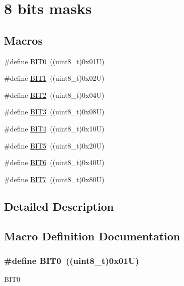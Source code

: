 \hypertarget{group_____bits___masks}{}\section{8 bits masks}
\label{group_____bits___masks}
\subsection*{Macros}
\begin{DoxyCompactItemize}
\item 
\#define \hyperlink{group_____bits___masks_gad4d43f8748b542bce39e18790f845ecc}{B\+I\+T0}~((uint8\+\_\+t)0x01\+U)
\item 
\#define \hyperlink{group_____bits___masks_ga601923eba46784638244c1ebf2622a2a}{B\+I\+T1}~((uint8\+\_\+t)0x02\+U)
\item 
\#define \hyperlink{group_____bits___masks_ga9c9560bccccb00174801c728f1ed1399}{B\+I\+T2}~((uint8\+\_\+t)0x04\+U)
\item 
\#define \hyperlink{group_____bits___masks_ga8e44574a8a8becc885b05f3bc367ef6a}{B\+I\+T3}~((uint8\+\_\+t)0x08\+U)
\item 
\#define \hyperlink{group_____bits___masks_gaa731e0b6cf75f4e637ee88959315f5e4}{B\+I\+T4}~((uint8\+\_\+t)0x10\+U)
\item 
\#define \hyperlink{group_____bits___masks_gae692bc3df48028ceb1ddc2534a993bb8}{B\+I\+T5}~((uint8\+\_\+t)0x20\+U)
\item 
\#define \hyperlink{group_____bits___masks_gacc2d074401e2b6322ee8f03476c24677}{B\+I\+T6}~((uint8\+\_\+t)0x40\+U)
\item 
\#define \hyperlink{group_____bits___masks_gaa6b8f3261ae9e2e1043380c192f7b5f0}{B\+I\+T7}~((uint8\+\_\+t)0x80\+U)
\end{DoxyCompactItemize}


\subsection{Detailed Description}


\subsection{Macro Definition Documentation}
\subsubsection[{\texorpdfstring{B\+I\+T0}{BIT0}}]{\setlength{\rightskip}{0pt plus 5cm}\#define B\+I\+T0~((uint8\+\_\+t)0x01\+U)}\hypertarget{group_____bits___masks_gad4d43f8748b542bce39e18790f845ecc}{}\label{group_____bits___masks_gad4d43f8748b542bce39e18790f845ecc}
B\+I\+T0 
